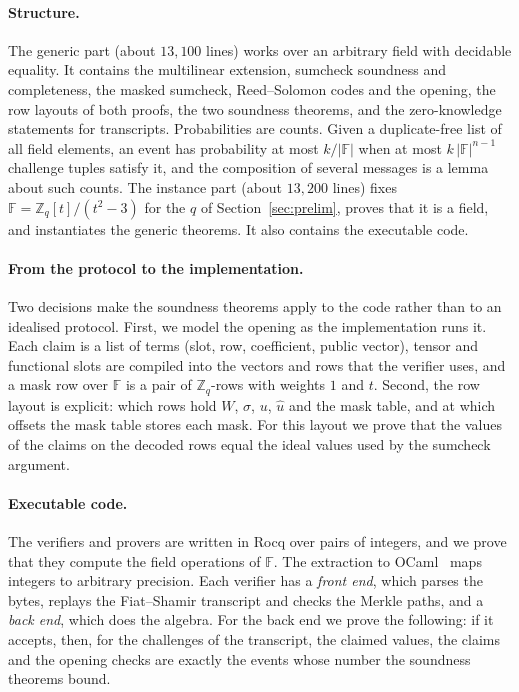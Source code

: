 \documentclass[sigconf,anonymous]{acmart}
\newcommand{\Zq}{\mathbb{Z}_q}
\newcommand{\F}{\mathbb{F}}
\newcommand{\uh}{\hat{u}}
\begin{document}
\paragraph{Structure.}
The generic part (about $13{,}100$ lines) works over an arbitrary field with decidable equality. It
contains the multilinear extension, sumcheck soundness and completeness, the masked sumcheck,
Reed--Solomon codes and the opening, the row layouts of both proofs, the two soundness theorems, and
the zero-knowledge statements for transcripts. Probabilities are counts. Given a duplicate-free list
of all field elements, an event has probability at most $k/|\F|$ when at most $k\,|\F|^{n-1}$
challenge tuples satisfy it, and the composition of several messages is a lemma about such counts.
The instance part (about $13{,}200$ lines) fixes $\F=\Zq[t]/(t^2-3)$ for the $q$ of
Section~\ref{sec:prelim}, proves that it is a field, and instantiates the generic theorems. It also
contains the executable code.

\paragraph{From the protocol to the implementation.}
Two decisions make the soundness theorems apply to the code rather than to an idealised protocol.
First, we model the opening as the implementation runs it. Each claim is a list of terms (slot, row,
coefficient, public vector), tensor and functional slots are compiled into the vectors and rows that
the verifier uses, and a mask row over $\F$ is a pair of $\Zq$-rows with weights $1$ and $t$.
Second, the row layout is explicit: which rows hold $W$, $\sigma$, $u$, $\uh$ and the mask table, and
at which offsets the mask table stores each mask. For this layout we prove that the values of the
claims on the decoded rows equal the ideal values used by the sumcheck argument.

\paragraph{Executable code.}
The verifiers and provers are written in Rocq over pairs of integers, and we prove that they compute
the field operations of $\F$. The extraction to OCaml~\cite{Letouzey02} maps integers to arbitrary
precision. Each verifier has a \emph{front end}, which parses the bytes, replays the Fiat--Shamir
transcript and checks the Merkle paths, and a \emph{back end}, which does the algebra. For the back
end we prove the following: if it accepts, then, for the challenges of the transcript, the claimed
values, the claims and the opening checks are exactly the events whose number the soundness theorems
bound.
\end{document}

